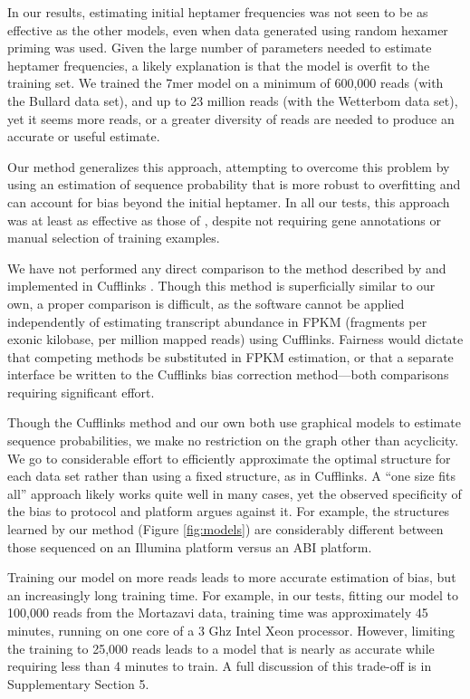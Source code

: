 \documentclass{bioinfo}
\begin{document}
In our results, estimating initial heptamer frequencies was not seen to be as
effective as the other models, even when data generated using random hexamer
priming was used. Given the large number of parameters needed to estimate
heptamer frequencies, a likely explanation is that the model is overfit to the
training set.  We trained the 7mer model on a minimum of 600,000 reads (with the
Bullard data set), and up to 23 million reads (with the Wetterbom data set), yet
it seems more reads, or a greater diversity of reads are needed to produce an
accurate or useful estimate.

Our method generalizes this approach, attempting to overcome this problem by
using an estimation of sequence probability that is more robust to overfitting
and can account for bias beyond the initial heptamer. In all our tests, this
approach was at least as effective as those of \citet{Li2010}, despite not
requiring gene annotations or manual selection of training examples.

We have not performed any direct comparison to the method described by
\citet{Roberts2011} and implemented in Cufflinks \citep{Trapnell2010}. Though
this method is superficially similar to our own, a proper comparison is
difficult, as the software cannot be applied independently of estimating
transcript abundance in FPKM (fragments per exonic kilobase, per million mapped
reads) using Cufflinks. Fairness would dictate that competing methods be
substituted in FPKM estimation, or that a separate interface be written to the
Cufflinks bias correction method---both comparisons requiring significant effort.

Though the Cufflinks method and our own both use graphical models to estimate
sequence probabilities, we make no restriction on the graph other than
acyclicity. We go to considerable effort to efficiently approximate the optimal
structure for each data set rather than using a fixed structure, as in
Cufflinks. A ``one size fits all'' approach likely works quite well in many
cases, yet the observed specificity of the bias to protocol and platform argues
against it. For example, the structures learned by our method (Figure
\ref{fig:models}) are considerably different between those sequenced on an
Illumina platform versus an ABI platform.

Training our model on more reads leads to more accurate estimation of bias, but
an increasingly long training time. For example, in our tests, fitting our model to
100,000 reads from the Mortazavi data, training time was approximately 45
minutes, running on one core of a 3 Ghz Intel Xeon processor. However, limiting
the training to 25,000 reads leads to a model that is nearly as accurate while
requiring less than 4 minutes to train. A full discussion of this trade-off is in
Supplementary Section 5.
\end{document}
